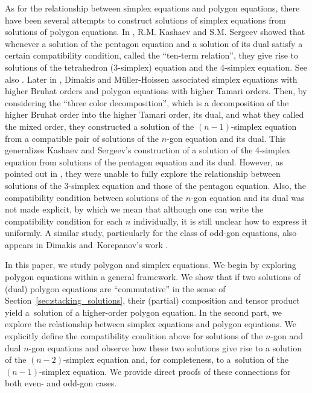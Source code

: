 \documentclass[pdftex]{sigma}
\numberwithin{equation}{section}
\theoremstyle{definition}
\begin{document}
As for the relationship between simplex equations and polygon equations, there have been several attempts to construct solutions of simplex equations from solutions of polygon equations. In \cite{kashaev1998pentagon}, R.M. Kashaev and S.M. Sergeev showed that whenever a solution of the pentagon equation and a solution of its dual satisfy a certain compatibility condition, called the ``ten-term relation'', they give rise to solutions of the tetrahedron (3-simplex) equation and the 4-simplex equation. See also \cite{kassotakis2023matrix}. Later in \cite{dimakis2015simplex}, Dimakis and M\"uller-Hoissen associated simplex equations with higher Bruhat orders and polygon equations with higher Tamari orders. Then, by considering the ``three color decomposition'', which is a decomposition of the higher Bruhat order into the higher Tamari order, its dual, and what they called the mixed order, they constructed a solution of the $(n-1)$-simplex equation from a compatible pair of solutions of the $n$-gon equation and its dual. This generalizes Kashaev and Sergeev's construction of a solution of the 4-simplex equation from solutions of the pentagon equation and its dual. However, as pointed out in \cite[Section~6]{dimakis2015simplex}, they were unable to fully explore the relationship between solutions of the 3-simplex equation and those of the pentagon equation. Also, the compatibility condition between solutions of the $n$-gon equation and its dual was not made explicit, by which we mean that although one can write the compatibility condition for each $n$ individually, it is still unclear how to express it uniformly. A similar study, particularly for the class of odd-gon equations, also appears in Dimakis and~Korepanov's work \cite{dimakis2021grassmannian}.


In this paper, we study polygon and simplex equations. We begin by exploring polygon equations within a general framework. We show that if two solutions of (dual) polygon equations are ``commutative'' in the sense of Section~\ref{sec:stacking_solutions}, their (partial) composition and tensor product yield a~solution of a higher-order polygon equation. In the second part, we explore the relationship between simplex equations and polygon equations. We explicitly define the compatibility condition above for solutions of the $n$-gon and dual $n$-gon equations and observe how these two solutions give rise to a solution of the $(n-2)$-simplex equation and, for completeness, to a~solution of the $(n-1)$-simplex equation. We provide direct proofs of these connections for both even- and odd-gon cases.
\end{document}
